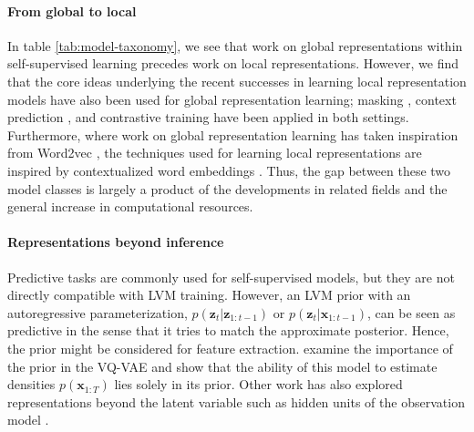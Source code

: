 {\paragraph{From global to local} 
In table \ref{tab:model-taxonomy}, we see that work on global representations within self-supervised learning precedes work on local representations. However, we find that the core ideas underlying the recent successes in learning local representation models have also been used for global representation learning; masking \cite{chung_audio_2016}, context prediction \cite{chung_speech2vec_2018}, and contrastive training \cite{milde_unspeech_2018} have been applied in both settings. Furthermore, where work on global representation learning has taken inspiration from Word2vec \cite{mikolov_distributed_2013}, the techniques used for learning local representations are inspired by contextualized word embeddings \cite{devlin_bert_2018}. Thus, the gap between these two model classes is largely a product of the developments in related fields and the general increase in computational resources.

\paragraph{Representations beyond inference} 
Predictive tasks are commonly used for self-supervised models, but they are not directly compatible with LVM training. 
However, an LVM prior with an autoregressive parameterization, $p(\mathbf{z}_t|\mathbf{z}_{1:t-1})$ or $p(\mathbf{z}_t|\mathbf{x}_{1:t-1})$, can be seen as predictive in the sense that it tries to match the approximate posterior.
Hence, the prior might be considered for feature extraction.
\citet{jones_is_2020} examine the importance of the prior in the VQ-VAE and show that the ability of this model to estimate densities $p(\mathbf{x}_{1:T})$ lies solely in its prior. Other work has also explored representations beyond the latent variable such as hidden units of the observation model \cite{khurana_convolutional_2020, chorowski_unsupervised_2019}.

}

